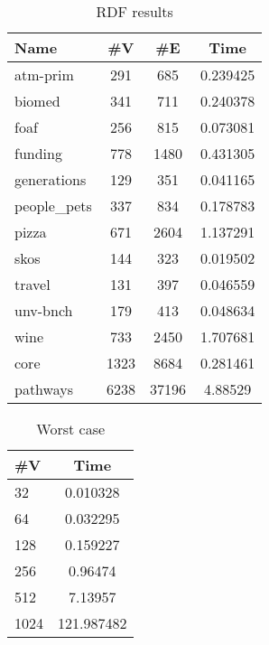 \begin{minipage}[t]{52mm}
{\setlength{\tabcolsep}{0.4em}
\begin{table}[H]
\centering
\caption{RDF results}
\label{tbl:tableRDF}
\begin{tabular}{| p{1.6cm} | c | c | c |}
    \hline
    Name                                & \#V & \#E     & Time \\
    \hline
    \hline
    \small{atm-prim}                    & 291 & 685     & 0.239425 \\
    \small{biomed}                      & 341 & 711     & 0.240378 \\
    \small{foaf}                        & 256 & 815     & 0.073081 \\
    \small{funding}                     & 778 & 1480    & 0.431305 \\
    \small{generations}                 & 129 & 351     & 0.041165 \\
    \small{people\_pets}                & 337 & 834     & 0.178783 \\
    \small{pizza}                       & 671 & 2604    & 1.137291 \\
    \small{skos}                        & 144 & 323     & 0.019502 \\
    \small{travel}                      & 131 & 397     & 0.046559 \\
    \small{unv-bnch}                    & 179 & 413     & 0.048634 \\
    \small{wine}                        & 733 & 2450    & 1.707681 \\
    \small{core}                        & 1323 & 8684   & 0.281461 \\
    \small{pathways}                    & 6238 & 37196  & 4.88529  \\
    \hline
  \end{tabular}
\end{table}
}

\end{minipage}
\hfill
\begin{minipage}[t]{27mm}

{
\begin{table}[H]
\centering
\caption{Worst case}
\label{tbl:tableWorst}
\begin{tabular}{| l | | c |}
    \hline
    \#V  & Time       \\
    \hline
    \hline
    
    32   & 0.010328   \\
    64   & 0.032295   \\
    128  & 0.159227   \\
    256  & 0.96474    \\
    512  & 7.13957    \\
    1024 & 121.987482 \\
    \hline
  \end{tabular}
\end{table}
}

\end{minipage}
